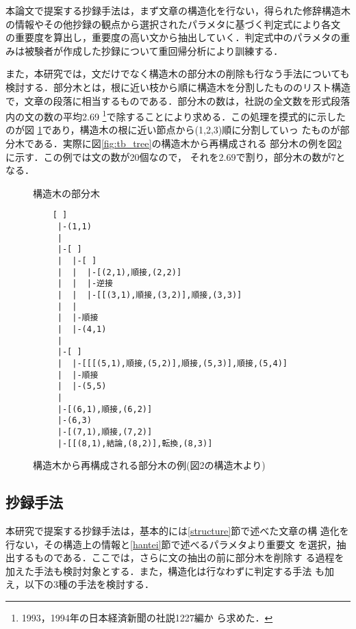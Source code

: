 本論文で提案する抄録手法は，まず文章の構造化を行ない，得られた修辞構造木 
の情報やその他抄録の観点から選択されたパラメタに基づく判定式により各文 
の重要度を算出し，重要度の高い文から抽出していく．判定式中のパラメタの重 
みは被験者が作成した抄録について重回帰分析により訓練する．

また，本研究では，文だけでなく構造木の部分木の削除も行なう手法についても
検討する．部分木とは，根に近い枝から順に構造木を分割したもののリスト構造
で，文章の段落に相当するものである．部分木の数は，社説の全文数を形式段落
内の文の数の平均2.69 \footnote{1993，1994年の日本経済新聞の社説1227編か
ら求めた．}で除することにより求める．この処理を摸式的に示したのが図
\ref{fig:sub_tree}であり，構造木の根に近い節点から(1,2,3)順に分割していっ
たものが部分木である．実際に図\ref{fig:tb_tree}の構造木から再構成される
部分木の例を図\ref{fig:part_tree}に示す．この例では文の数が20個なので，
それを2.69で割り，部分木の数が7となる．

\begin{figure}[hbtp]
 \begin{center}
  \caption{構造木の部分木}
  \label{fig:sub_tree}
 \end{center}
\end{figure}

 \begin{figure}[htbp]
  {\footnotesize
  {\baselineskip=11pt
  \begin{verbatim}			     
    [ ]
     |-(1,1)
     |
     |-[ ]
     |  |-[ ]
     |  |  |-[(2,1),順接,(2,2)]
     |  |  |-逆接
     |  |  |-[[(3,1),順接,(3,2)],順接,(3,3)]
     |  | 
     |  |-順接
     |  |-(4,1)
     |
     |-[ ]
     |  |-[[[(5,1),順接,(5,2)],順接,(5,3)],順接,(5,4)]
     |  |-順接
     |  |-(5,5)
     |
     |-[(6,1),順接,(6,2)]
     |-(6,3)
     |-[(7,1),順接,(7,2)]
     |-[[(8,1),結論,(8,2)],転換,(8,3)]
  \end{verbatim}
  }
  \vspace{-6ex}
  \caption{構造木から再構成される部分木の例(図2の構造木より)}
  \label{fig:part_tree}}
 \end{figure}


\subsection{抄録手法}\label{method}

本研究で提案する抄録手法は，基本的には\ref{structure}節で述べた文章の構
造化を行ない，その構造上の情報と\ref{hantei}節で述べるパラメタより重要文
を選択，抽出するものである．ここでは，さらに文の抽出の前に部分木を削除す
る過程を加えた手法も検討対象とする．また，構造化は行なわずに判定する手法
も加え，以下の3種の手法を検討する．


